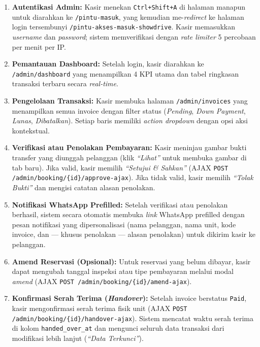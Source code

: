 \documentclass[11pt, a5paper]{article}
\begin{document}
\begin{enumerate}[label=\arabic*.]
  \item \textbf{Autentikasi Admin:} Kasir menekan \texttt{Ctrl+Shift+A} di
        halaman manapun untuk diarahkan ke \texttt{/pintu-masuk}, yang kemudian
        me-\textit{redirect} ke halaman login tersembunyi
        \texttt{/pintu-akses-masuk-showdrive}. Kasir memasukkan \textit{username}
        dan \textit{password}; sistem memverifikasi dengan \textit{rate limiter}
        5 percobaan per menit per IP.

  \item \textbf{Pemantauan Dashboard:} Setelah login, kasir diarahkan ke
        \texttt{/admin/dashboard} yang menampilkan 4 KPI utama dan tabel
        ringkasan transaksi terbaru secara \textit{real-time}.

  \item \textbf{Pengelolaan Transaksi:} Kasir membuka halaman
        \texttt{/admin/invoices} yang menampilkan semua invoice dengan filter
        status (\textit{Pending}, \textit{Down Payment}, \textit{Lunas},
        \textit{Dibatalkan}). Setiap baris memiliki \textit{action dropdown}
        dengan opsi aksi kontekstual.

  \item \textbf{Verifikasi atau Penolakan Pembayaran:} Kasir meninjau gambar
        bukti transfer yang diunggah pelanggan (klik \textit{``Lihat''} untuk
        membuka gambar di tab baru). Jika valid, kasir memilih \textit{``Setujui
        \& Sahkan''} (AJAX \texttt{POST /admin/booking/\{id\}/approve-ajax}).
        Jika tidak valid, kasir memilih \textit{``Tolak Bukti''} dan mengisi
        catatan alasan penolakan.

  \item \textbf{Notifikasi WhatsApp Prefilled:} Setelah verifikasi atau
        penolakan berhasil, sistem secara otomatis membuka \textit{link}
        WhatsApp prefilled dengan pesan notifikasi yang dipersonalisasi (nama
        pelanggan, nama unit, kode invoice, dan — khusus penolakan — alasan
        penolakan) untuk dikirim kasir ke pelanggan.

  \item \textbf{Amend Reservasi (Opsional):} Untuk reservasi yang belum dibayar,
        kasir dapat mengubah tanggal inspeksi atau tipe pembayaran melalui modal
        \textit{amend} (AJAX \texttt{POST /admin/booking/\{id\}/amend-ajax}).

  \item \textbf{Konfirmasi Serah Terima (\textit{Handover}):} Setelah invoice
        berstatus \texttt{Paid}, kasir mengonfirmasi serah terima fisik unit
        (AJAX \texttt{POST /admin/booking/\{id\}/handover-ajax}). Sistem mencatat
        waktu serah terima di kolom \texttt{handed\_over\_at} dan mengunci seluruh
        data transaksi dari modifikasi lebih lanjut (\textit{``Data Terkunci''}).
\end{enumerate}
\end{document}
